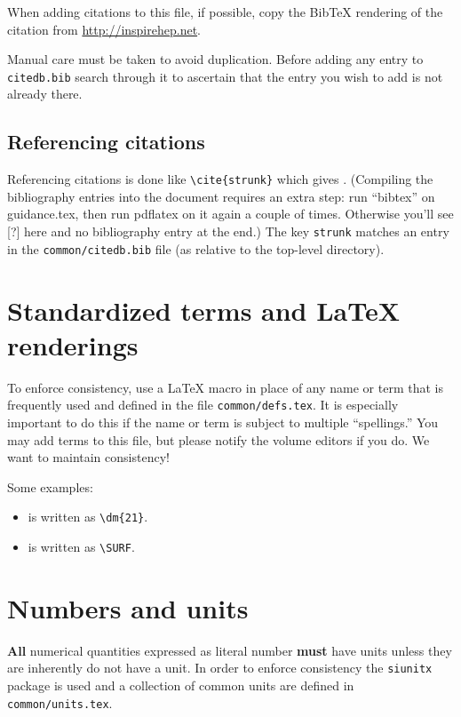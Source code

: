 When adding citations to this file, if possible, copy the BibTeX rendering of the citation from \url{http://inspirehep.net}.

Manual care must be taken to avoid duplication.
Before adding any entry to \texttt{citedb.bib} search through it
to ascertain that the entry you wish to add is not already there.

\subsection{Referencing citations}
\label{sec:latex-ref}

Referencing citations is done like \verb|\cite{strunk}| which gives \cite{strunk}.
(Compiling the bibliography entries into the document requires an extra step: run ``bibtex'' on
 guidance.tex, then run pdflatex on it again a couple of times. Otherwise you'll see [?] here 
 and no bibliography entry at the end.) 
The key \texttt{strunk} matches an entry in the \texttt{common/citedb.bib}
file (as relative to the top-level directory).

\section{Standardized terms and \LaTeX{} renderings}
\label{sec:latex-terms}

To enforce consistency, use a \LaTeX{} macro in place of any name or
term that is frequently used and defined in the file \texttt{common/defs.tex}.  
It is especially important to do this if the name or term is subject
to multiple ``spellings.'' You may add terms
to this file, but please notify the volume editors if you do. We want to maintain consistency! 

Some examples:

\begin{itemize}
\item {} is written as \verb|\dm{21}|.
\item \SURF is written as \verb|\SURF|.
\end{itemize}

\section{Numbers and units}

\textbf{All} numerical quantities expressed as literal number
\textbf{must} have units unless they are inherently do not have a unit.
In order to enforce consistency the \texttt{siunitx} package is used
and a collection of common units are defined in
\texttt{common/units.tex}.

